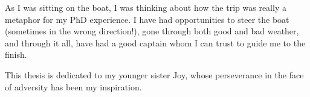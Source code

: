 \begin{frontmatter}
\begin{abstract}
\vspace{1cm}

\noindent Primary Reader: Ernst Niebur\\
Secondary Reader: R{\"u}diger von der Heydt

\end{abstract}

\begin{acknowledgment}

As I was sitting on the boat, I was thinking about how the trip was really a metaphor for my PhD experience. I have had opportunities to steer the boat (sometimes in the wrong direction!), gone through both good and bad weather, and through it all, have had a good captain whom I can trust to guide me to the finish.

\end{acknowledgment}

\begin{dedication}
 
This thesis is dedicated to my younger sister Joy, whose perseverance in the face of adversity has been my inspiration.

\end{dedication}

\tableofcontents

\listoftables

\listoffigures

\end{frontmatter}

